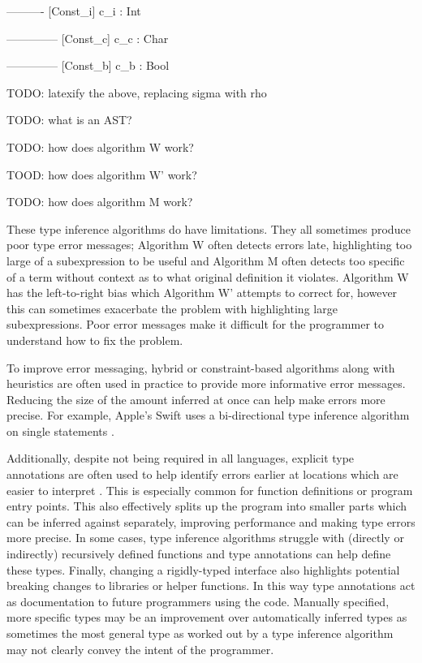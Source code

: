 \documentclass[a4paper,fleqn,12pt]{article}
\begin{document}
---------- [Const\_i]
c\_i : Int

-------------- [Const\_c]
c\_c : Char

-------------- [Const\_b]
c\_b : Bool

TODO: latexify the above, replacing sigma with rho

TODO: what is an AST?

TODO: how does algorithm W work?

TOOD: how does algorithm W’ work?

TODO: how does algorithm M work?

These type inference algorithms do have limitations. They all sometimes produce poor type error messages; Algorithm W often detects errors late, highlighting too large of a subexpression to be useful and Algorithm M often detects too specific of a term without context as to what original definition it violates. Algorithm W has the left-to-right bias which Algorithm W’ attempts to correct for, however this can sometimes exacerbate the problem with highlighting large subexpressions. Poor error messages make it difficult for the programmer to understand how to fix the problem.

To improve error messaging, hybrid or constraint-based algorithms along with heuristics are often used in practice to provide more informative error messages. Reducing the size of the amount inferred at once can help make errors more precise. For example, Apple’s Swift uses a bi-directional type inference algorithm on single statements \citep{ref32}.

Additionally, despite not being required in all languages, explicit type annotations are often used to help identify errors earlier at locations which are easier to interpret \citep{ref33}. This is especially common for function definitions or program entry points. This also effectively splits up the program into smaller parts which can be inferred against separately, improving performance and making type errors more precise. In some cases, type inference algorithms struggle with (directly or indirectly) recursively defined functions and type annotations can help define these types. Finally, changing a rigidly-typed interface also highlights potential breaking changes to libraries or helper functions. In this way type annotations act as documentation to future programmers using the code. Manually specified, more specific types may be an improvement over automatically inferred types as sometimes the most general type as worked out by a type inference algorithm may not clearly convey the intent of the programmer.
\end{document}
